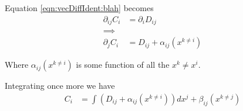 Equation \ref{eqn:vecDiffIdent:blah} becomes
\begin{align*}
\partial_{ij} C_i &= \partial_{i} D_{ij}  \\
\implies \\
\partial_{j} C_i &= D_{ij} + \alpha_{ij}(x^{k \ne i})
\end{align*}

Where $\alpha_{ij}(x^{k \ne i})$ is some function of all the $x^k \ne x^i$.

Integrating once more we have
\begin{align*}
C_i &= \int \left(D_{ij} + \alpha_{ij}(x^{k \ne i}) \right) dx^j + \beta_{ij}(x^{k \ne j})
\end{align*}
